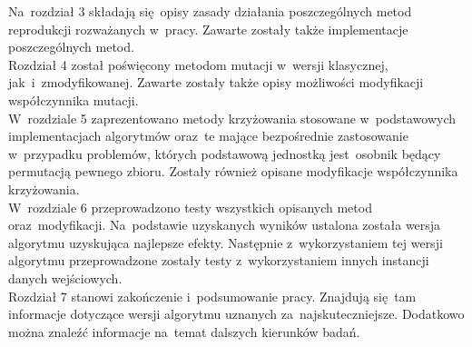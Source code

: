 Na~rozdział 3 składają się~opisy zasady działania poszczególnych metod reprodukcji rozważanych w~pracy. Zawarte zostały także implementacje poszczególnych metod.\\
Rozdział 4 został poświęcony metodom mutacji w~wersji klasycznej, jak~i~zmodyfikowanej. Zawarte zostały także opisy możliwości modyfikacji współczynnika mutacji.\\
W~rozdziale 5 zaprezentowano metody krzyżowania stosowane w~podstawowych implementacjach algorytmów oraz~te mające bezpośrednie zastosowanie w~przypadku problemów, których podstawową jednostką jest~osobnik będący permutacją pewnego zbioru. Zostały również opisane modyfikacje współczynnika krzyżowania.\\
W~rozdziale 6 przeprowadzono testy wszystkich opisanych metod oraz~modyfikacji. Na~podstawie uzyskanych wyników ustalona została wersja algorytmu uzyskująca najlepsze efekty. Następnie z~wykorzystaniem tej wersji algorytmu przeprowadzone zostały testy z~wykorzystaniem innych instancji danych wejściowych.\\
Rozdział 7 stanowi zakończenie i~podsumowanie pracy. Znajdują się~tam informacje dotyczące wersji algorytmu uznanych za~najskuteczniejsze. Dodatkowo można znaleźć informacje na~temat dalszych kierunków badań.
